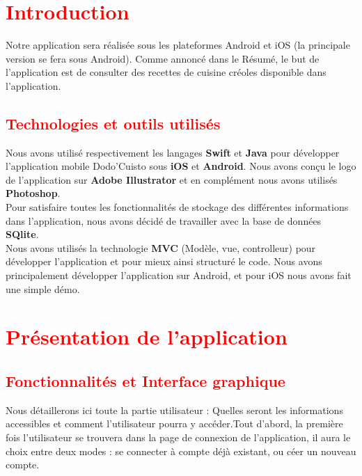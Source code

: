 \documentclass{article}
\begin{document}

\newpage

\section{\textcolor{red}{Introduction}}

Notre application sera réalisée sous les plateformes Android et iOS (la principale version se fera sous Android). Comme annoncé dans le Résumé, le but de l’application est de consulter des recettes de cuisine créoles disponible dans l’application.

\subsection{\textcolor{red}{Technologies et outils utilisés}}

Nous avons utilisé respectivement les langages \textbf{Swift} et \textbf{Java} pour développer l’application mobile Dodo’Cuisto sous \textbf{iOS} et \textbf{Android}. Nous avons conçu le logo de l’application sur \textbf{Adobe Illustrator} et en complément nous avons utilisés \textbf{Photoshop}.\\

Pour satisfaire toutes les fonctionnalités de stockage des différentes informations dans l’application, nous avons décidé de travailler avec la base de données \textbf{SQlite}.\\

Nous avons utilisés la technologie \textbf{MVC} (Modèle, vue, controlleur) pour développer l’application et pour mieux ainsi structuré le code. Nous avons principalement développer l’application sur Android, et pour iOS nous avons fait une simple démo.\\



\section{\textcolor{red}{Présentation de l’application}}

\subsection{\textcolor{red}{Fonctionnalités et Interface graphique}}

Nous détaillerons ici toute la partie utilisateur : Quelles seront les informations accessibles et comment l’utilisateur pourra y accéder.Tout d’abord, la première fois l’utilisateur se trouvera dans la page de connexion de l’application, il aura le choix entre deux modes : se connecter à compte déjà existant, ou céer un nouveau compte.
\end{document}
